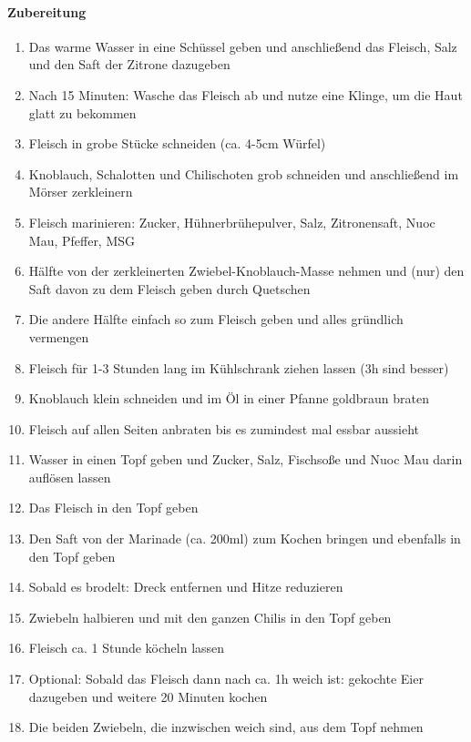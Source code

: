 \paragraph{Zubereitung}
\begin{enumerate}[noitemsep]
	\item Das warme Wasser in eine Schüssel geben und anschließend das Fleisch, Salz und den Saft der Zitrone dazugeben
	\item Nach 15 Minuten: Wasche das Fleisch ab und nutze eine Klinge, um die Haut glatt zu bekommen  
	\item Fleisch in grobe Stücke schneiden (ca. 4-5cm Würfel) 
	\item Knoblauch, Schalotten und Chilischoten grob schneiden und anschließend im Mörser zerkleinern
	\item Fleisch marinieren: Zucker, Hühnerbrühepulver, Salz, Zitronensaft, Nuoc Mau, Pfeffer, MSG
	\item Hälfte von der zerkleinerten Zwiebel-Knoblauch-Masse nehmen und (nur) den Saft davon zu dem Fleisch geben durch Quetschen
	\item Die andere Hälfte einfach so zum Fleisch geben und alles gründlich vermengen
	\item Fleisch für 1-3 Stunden lang im Kühlschrank ziehen lassen (3h sind besser)
	\item Knoblauch klein schneiden und im Öl in einer Pfanne goldbraun braten
	\item Fleisch auf allen Seiten anbraten bis es zumindest mal essbar aussieht
	\item Wasser in einen Topf geben und Zucker, Salz, Fischsoße und Nuoc Mau darin auflösen lassen 
	\item Das Fleisch in den Topf geben 
	\item Den Saft von der Marinade (ca. 200ml) zum Kochen bringen und ebenfalls in den Topf geben
	\item Sobald es brodelt: Dreck entfernen und Hitze reduzieren
	\item Zwiebeln halbieren und mit den ganzen Chilis in den Topf geben 
	\item Fleisch ca. 1 Stunde köcheln lassen
	\item Optional: Sobald das Fleisch dann nach ca. 1h weich ist: gekochte Eier dazugeben und weitere 20 Minuten kochen
	\item Die beiden Zwiebeln, die inzwischen weich sind, aus dem Topf nehmen
\end{enumerate}